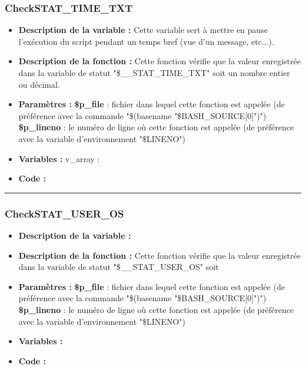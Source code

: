 \documentclass[a4paper,10pt]{article}
\begin{document}
\subsubsection{CheckSTAT\_TIME\_TXT}\color{white}
\begin{itemize}
    \item \textbf{Description de la variable :} Cette variable sert à mettre en pause l'exécution du script pendant un temps bref (vue d'un message, etc...).

    \item \textbf{Description de la fonction :} Cette fonction vérifie que la valeur enregistrée dans la variable de statut "\$\_\_STAT\_TIME\_TXT" soit un nombre entier ou décimal.

    \item \textbf{Paramètres :}
        \color{orange}\textbf{\$p\_file}\color{white} : fichier dans lequel cette fonction est appelée (de préférence avec la commande "\$(\color{gray}basename \color{white}"\color{orange}\$BASH\_SOURCE[0]\color{white}")")
    \color{orange}\textbf{\$p\_lineno}\color{white} : le numéro de ligne où cette fonction est appelée (de préférence avec la variable d'environnement "\color{orange}\$LINENO\color{white}")

    \item \textbf{Variables :} v\_array :

    \item \textbf{Code :}
\end{itemize}


\color{blue}\par\noindent\rule{\textwidth}{0.4pt}\color{white}

\color{blue}
\subsubsection{CheckSTAT\_USER\_OS}\color{white}
\begin{itemize}
    \item \textbf{Description de la variable :}

    \item \textbf{Description de la fonction :} Cette fonction vérifie que la valeur enregistrée dans la variable de statut "\$\_\_STAT\_USER\_OS" soit

    \item \textbf{Paramètres :}
        \color{orange}\textbf{\$p\_file}\color{white} : fichier dans lequel cette fonction est appelée (de préférence avec la commande "\$(\color{gray}basename \color{white}"\color{orange}\$BASH\_SOURCE[0]\color{white}")")
    \color{orange}\textbf{\$p\_lineno}\color{white} : le numéro de ligne où cette fonction est appelée (de préférence avec la variable d'environnement "\color{orange}\$LINENO\color{white}")

    \item \textbf{Variables :}

    \item \textbf{Code :}
\end{itemize}
\end{document}
